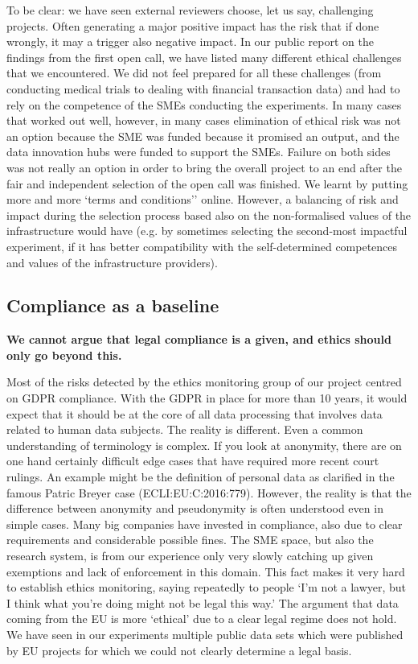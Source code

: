 To be clear: we have seen external reviewers choose, let us say,
challenging projects. Often generating a major positive impact has the
risk that if done wrongly, it may a trigger also negative impact. In our
public report on the findings from the first open call, we have listed
many different ethical challenges that we encountered. We did not feel
prepared for all these challenges (from conducting medical trials to
dealing with financial transaction data) and had to rely on the
competence of the SMEs conducting the experiments. In many cases that
worked out well, however, in many cases elimination of ethical risk was
not an option because the SME was funded because it promised an output,
and the data innovation hubs were funded to support the SMEs. Failure on
both sides was not really an option in order to bring the overall
project to an end after the fair and independent selection of the open
call was finished. We learnt by putting more and more `terms and
conditions'' online. However, a balancing of risk and impact during the
selection process based also on the non-formalised values of the
infrastructure would have (e.g. by sometimes selecting the second-most
impactful experiment, if it has better compatibility with the
self-determined competences and values of the infrastructure providers).

\subsection{Compliance as a baseline}\label{compliance-as-a-baseline}

\textbf{We cannot argue that legal compliance is a given, and ethics
should only go beyond this.}

Most of the risks detected by the ethics monitoring group of our project
centred on GDPR compliance. With the GDPR in place for more than 10
years, it would expect that it should be at the core of all data
processing that involves data related to human data subjects. The
reality is different. Even a common understanding of terminology is
complex. If you look at anonymity, there are on one hand certainly
difficult edge cases that have required more recent court rulings. An
example might be the definition of personal data as clarified in the
famous Patric Breyer case (ECLI:EU:C:2016:779). However, the reality is
that the difference between anonymity and pseudonymity is often
understood even in simple cases. Many big companies have invested in
compliance, also due to clear requirements and considerable possible
fines. The SME space, but also the research system, is from our
experience only very slowly catching up given exemptions and lack of
enforcement in this domain. This fact makes it very hard to establish
ethics monitoring, saying repeatedly to people `I'm not a lawyer, but I
think what you're doing might not be legal this way.' The argument that
data coming from the EU is more `ethical' due to a clear legal regime
does not hold. We have seen in our experiments multiple public data sets
which were published by EU projects for which we could not clearly
determine a legal basis.

